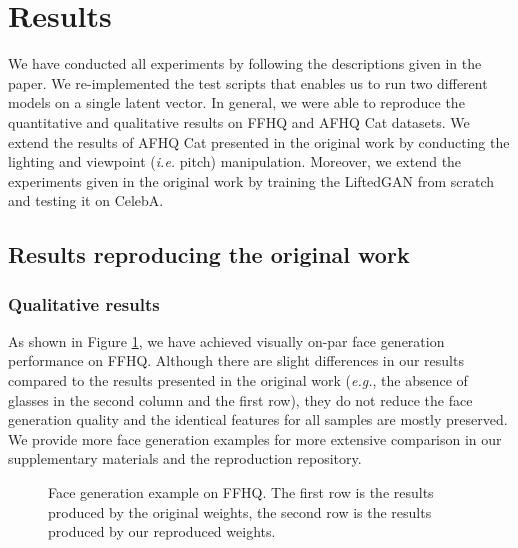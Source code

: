 \section{Results}
\label{sec:results}

We have conducted all experiments by following the descriptions given in the paper. We re-implemented the test scripts that enables us to run two different models on a single latent vector. In general, we were able to reproduce the quantitative and qualitative results on FFHQ and AFHQ Cat datasets. We extend the results of AFHQ Cat presented in the original work by conducting the lighting and viewpoint (\textit{i.e.} pitch) manipulation. Moreover, we extend the experiments given in the original work by training the LiftedGAN from scratch and testing it on CelebA.


\subsection{Results reproducing the original work}
\subsubsection{Qualitative results}

As shown in Figure \ref{fig:original_vs_re_faces}, we have achieved visually on-par face generation performance on FFHQ. Although there are slight differences in our results compared to the results presented in the original work (\textit{e.g.}, the absence of glasses in the second column and the first row), they do not reduce the face generation quality and the identical features for all samples are mostly preserved. We provide more face generation examples for more extensive comparison in our supplementary materials and the reproduction repository.

\begin{figure}[t!]
    \centering
    \caption{Face generation example on FFHQ. The first row is the results produced by the original weights, the second row is the results produced by our reproduced weights.}
    \label{fig:original_vs_re_faces}
\end{figure}

